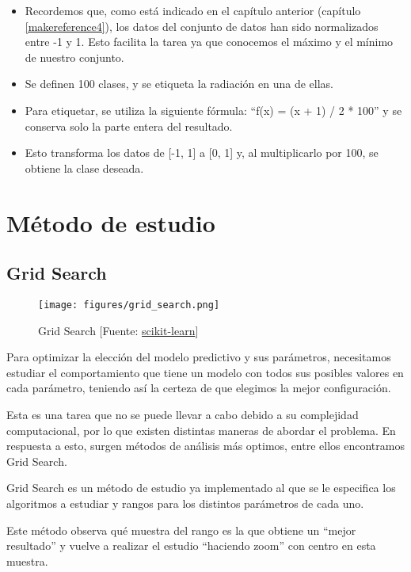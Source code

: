 	\begin{itemize}
		\item Recordemos que, como está indicado en el capítulo anterior (capítulo \ref{makereference4}), los datos del conjunto de datos han sido normalizados entre -1 y 1. Esto facilita la tarea ya que conocemos el máximo y el mínimo de nuestro conjunto.
		\item Se definen 100 clases, y se etiqueta la radiación en una de ellas.
		\item Para etiquetar, se utiliza la siguiente fórmula: ``f(x) = (x + 1) / 2 * 100'' y se conserva solo la parte entera del resultado.
		\item Esto transforma los datos de [-1, 1] a [0, 1] y, al multiplicarlo por 100, se obtiene la clase deseada. 
	\end{itemize}

\section{Método de estudio}
\label{makereference5.4}
	\subsection{Grid Search}

	\begin{figure}[htb]
		\begin{center}
			\texttt{[image: figures/grid\_search.png]}
			\caption{Grid Search [Fuente: \href{www.scikit-learn.org}{scikit-learn}] \label{grid}}
		\end{center}
	\end{figure}

	Para optimizar la elección del modelo predictivo y sus parámetros, necesitamos estudiar el comportamiento que tiene un modelo con todos sus posibles valores en cada parámetro, teniendo así la certeza de que elegimos la mejor configuración.

	Esta es una tarea que no se puede llevar a cabo debido a su complejidad computacional, por lo que existen distintas maneras de abordar el problema. En respuesta a esto, surgen métodos de análisis más optimos, entre ellos encontramos Grid Search.

	Grid Search es un método de estudio ya implementado al que se le especifica los algoritmos a estudiar y rangos para los distintos parámetros de cada uno. 

	Este método observa qué muestra del rango es la que obtiene un ``mejor resultado'' y vuelve a realizar el estudio ``haciendo zoom'' con centro en esta muestra.

